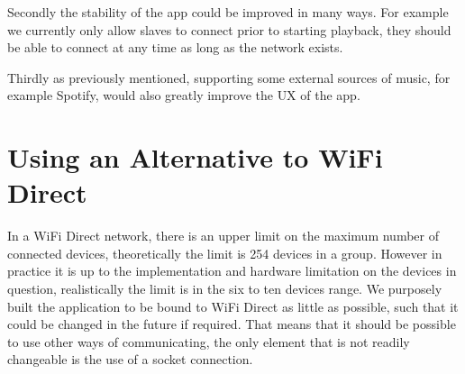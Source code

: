 Secondly the stability of the app could be improved in many ways.
For example we currently only allow slaves to connect prior to starting playback, they should be able to connect at any time as long as the network exists.

Thirdly as previously mentioned, supporting some external sources of music, for example Spotify, would also greatly improve the \ac{UX} of the app.

\section{Using an Alternative to WiFi Direct}
In a WiFi Direct network, there is an upper limit on the maximum number of connected devices, theoretically the limit is 254 devices in a group.
However in practice it is up to the implementation and hardware limitation on the devices in question, realistically the limit is in the six to ten devices range.
We purposely built the application to be bound to WiFi Direct as little as possible, such that it could be changed in the future if required.
That means that it should be possible to use other ways of communicating, the only element that is not readily changeable is the use of a socket connection.





